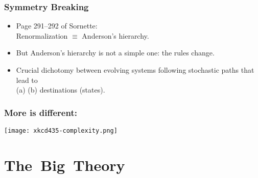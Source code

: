 \begin{frame}
  \frametitle{Symmetry Breaking}

  \begin{block}{}
    \begin{itemize}
    \item<1-> 
      Page 291--292 of Sornette\cite{sornette2003a}:\\
      Renormalization $\equiv$ Anderson's hierarchy.
    \item<2->
      But Anderson's hierarchy is not a simple one: the rules change.
    \item<3->
      Crucial dichotomy between evolving systems
      following stochastic paths that lead
      to \\
      (a)  
      (b) 
      destinations (states).
    \end{itemize}
  \end{block}


\end{frame}


\begin{frame}
  \frametitle{More is different:}

  \texttt{[image: xkcd435-complexity.png]}\\

\end{frame}

\section{The\ Big\ Theory}

